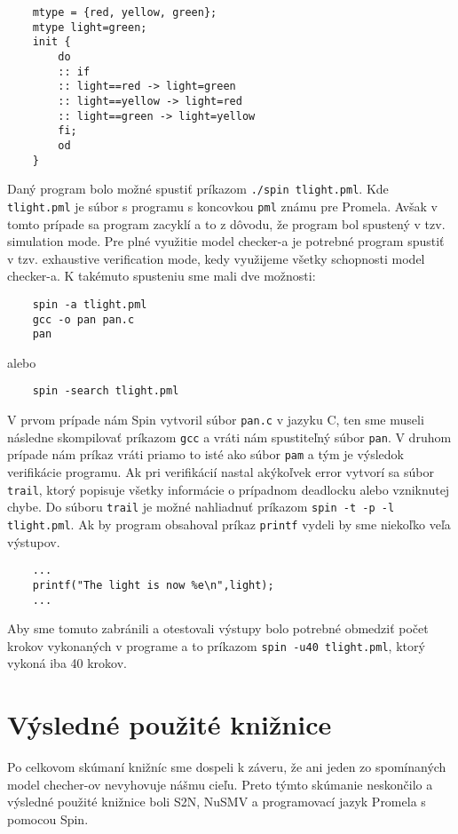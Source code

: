 \begin{lstlisting}
    mtype = {red, yellow, green};
    mtype light=green;
    init {
        do
        :: if
        :: light==red -> light=green
        :: light==yellow -> light=red
        :: light==green -> light=yellow
        fi;
        od
    }
\end{lstlisting}

Daný program bolo možné spustiť príkazom \texttt{./spin tlight.pml}. Kde \texttt{tlight.pml} je súbor s programu
s koncovkou \texttt{pml} známu pre Promela. Avšak v tomto prípade sa program zacyklí a to z dôvodu, že program
bol spustený v tzv. simulation mode. Pre plné využitie model checker-a je potrebné program spustiť v tzv. exhaustive 
verification mode, kedy využijeme všetky schopnosti model checker-a. K takémuto spusteniu sme mali dve možnosti:

\begin{lstlisting}
    spin -a tlight.pml
    gcc -o pan pan.c
    pan
\end{lstlisting}

alebo 

\begin{lstlisting}
    spin -search tlight.pml
\end{lstlisting}

V prvom prípade nám Spin vytvoril súbor \texttt{pan.c} v jazyku C, ten sme museli následne skompilovať príkazom 
\texttt{gcc} a vráti nám spustiteľný súbor \texttt{pan}. V druhom prípade nám príkaz vráti priamo to isté ako 
súbor \texttt{pam} a tým je výsledok verifikácie programu. Ak pri verifikácií nastal akýkoľvek error vytvorí
sa súbor \texttt{trail}, ktorý popisuje všetky informácie o prípadnom deadlocku alebo vzniknutej chybe. Do súboru 
\texttt{trail} je možné nahliadnuť príkazom \texttt{spin -t -p -l tlight.pml}. Ak by program obsahoval 
príkaz \texttt{printf} vydeli by sme niekoľko veľa výstupov.

\begin{lstlisting}
    ...
    printf("The light is now %e\n",light);
    ...
\end{lstlisting}

Aby sme tomuto zabránili a otestovali výstupy bolo potrebné obmedziť počet krokov vykonaných 
v programe a to príkazom \texttt{spin -u40 tlight.pml}, ktorý vykoná iba 40 krokov.

\section{Výsledné použité knižnice}
Po celkovom skúmaní knižníc sme dospeli k záveru, že ani jeden zo spomínaných model checher-ov nevyhovuje 
nášmu cieľu. Preto týmto skúmanie neskončilo a výsledné použité knižnice boli S2N, NuSMV a programovací 
jazyk Promela s pomocou Spin.

